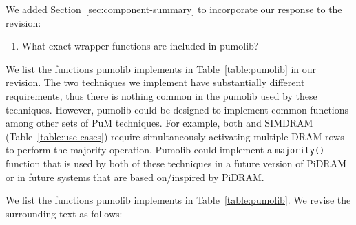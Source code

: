 We added Section~\ref{sec:component-summary} to incorporate our response to the revision:

\vspace{5pt}
\yyboxbegin 
{}
\yyboxend 

\newpage
\begin{tcolorbox}
    \begin{enumerate}[label=R3/\arabic*]
        \addtocounter{enumi}{2}
        \item \label{q:r3q3} What exact wrapper functions are included in pumolib?
    \end{enumerate}
\end{tcolorbox} 

We list the functions pumolib implements in Table~\ref{table:pumolib} in our revision. The two techniques we implement have substantially different requirements, thus there is nothing common in the pumolib used by these techniques. However, pumolib could be designed to implement common functions among other sets of PuM techniques. For example, both  and SIMDRAM (Table~\ref{table:use-cases}) require simultaneously activating multiple DRAM rows to perform the majority operation. Pumolib could implement a \texttt{majority()} function that is used by both of these techniques in a future version of PiDRAM or in future systems that are based on/inspired by PiDRAM.

We list the functions pumolib implements in Table~\ref{table:pumolib}. We revise the surrounding text  as follows: 

\vspace{5pt}
\yyboxbegin 
{}

\centering

